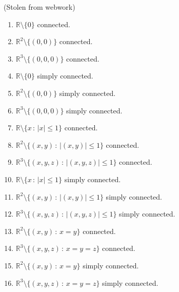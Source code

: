 \documentclass{ximera}
\begin{document}
\begin{problem}(Stolen from webwork)
\begin{enumerate}
\item $\mathbb{R}\setminus \{0\}$  connected.
\item $\mathbb{R}^2\setminus \{(0,0)\}$  connected.
\item $\mathbb{R}^3\setminus \{(0,0,0)\}$  connected.
\item $\mathbb{R}\setminus \{0\}$  simply connected.
\item $\mathbb{R}^2\setminus \{(0,0)\}$  simply connected.
\item $\mathbb{R}^3\setminus \{(0,0,0)\}$  simply connected.
\item $\mathbb{R}\setminus \{x\,:\,|x|\leq 1\}$  connected.
\item $\mathbb{R}^2\setminus \{(x,y)\,:\,|(x,y)|\leq 1\}$  connected.
\item $\mathbb{R}^3\setminus \{(x,y,z)\,:\,|(x,y,z)|\leq 1\}$  connected.
\item $\mathbb{R}\setminus \{x\,:\,|x|\leq 1\}$  simply connected.
\item $\mathbb{R}^2\setminus \{(x,y)\,:\,|(x,y)|\leq 1\}$  simply connected.
\item $\mathbb{R}^3\setminus \{(x,y,z)\,:\,|(x,y,z)|\leq 1\}$  simply connected.
\item $\mathbb{R}^2\setminus \{(x,y)\,:\,x=y\}$  connected.
\item $\mathbb{R}^3\setminus \{(x,y,z)\,:\,x=y=z\}$  connected.
\item $\mathbb{R}^2\setminus \{(x,y)\,:\,x=y\}$  simply connected.
\item $\mathbb{R}^3\setminus \{(x,y,z)\,:\,x=y=z\}$  simply connected.
\end{enumerate}
\end{problem}
\end{document}
